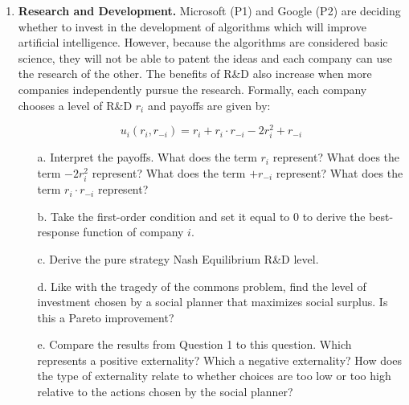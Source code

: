 \documentclass{article}
\begin{document}
\begin{enumerate}
\begin{enumerate}
        \vspace{6cm}
        
    \end{enumerate}
    \item \textbf{Research and Development.} Microsoft (P1) and Google (P2) are deciding whether to invest in the development of algorithms which will improve artificial intelligence. However, because the algorithms are considered basic science, they will not be able to patent the ideas and each company can use the research of the other. The benefits of R\&D also increase when more companies independently pursue the research. Formally, each company chooses a level of R\&D $r_i$ and payoffs are given by:
    
    \[u_i(r_i, r_{-i}) = r_i +r_i\cdot r_{-i}-2r_i^2+r_{-i} \]
    \begin{enumerate}
        \item[a.] Interpret the payoffs. What does the term $r_i$ represent? What does the term $-2r_i^2$ represent? What does the term $+r_{-i}$ represent? What does the term $r_i\cdot r_{-i}$ represent?
        
        \vspace{4cm}
        
        \item[b.] Take the first-order condition and set it equal to 0 to derive the best-response function of company $i$.
        
        \vspace{4cm}
        
        \item[c.] Derive the pure strategy Nash Equilibrium R\&D level.
        
        \vspace{6cm}
        
        \item[d.] Like with the tragedy of the commons problem, find the level of investment chosen by a social planner that maximizes social surplus. Is this a Pareto improvement?
        
        \vspace{6cm}
        
        \item[e.] Compare the results from Question 1 to this question. Which represents a positive externality? Which a negative externality? How does the type of externality relate to whether choices are too low or too high relative to the actions chosen by the social planner?
        

\end{enumerate}
\end{enumerate}
\end{document}

